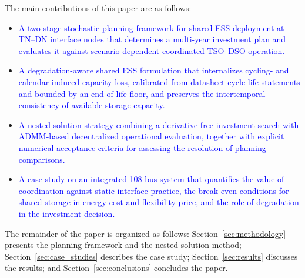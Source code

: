 \documentclass[preprint,12pt]{elsarticle}
\begin{document}
The main contributions of this paper are as follows:
\begin{itemize}
    \item \textcolor{blue}{A two-stage stochastic planning framework for shared ESS deployment at TN--DN interface nodes that determines a multi-year investment plan and evaluates it against scenario-dependent coordinated TSO--DSO operation.}
    \item \textcolor{blue}{A degradation-aware shared ESS formulation that internalizes cycling- and calendar-induced capacity loss, calibrated from datasheet cycle-life statements and bounded by an end-of-life floor, and preserves the intertemporal consistency of available storage capacity.}
    \item \textcolor{blue}{A nested solution strategy combining a derivative-free investment search with ADMM-based decentralized operational evaluation, together with explicit numerical acceptance criteria for assessing the resolution of planning comparisons.}
    \item \textcolor{blue}{A case study on an integrated 108-bus system that quantifies the value of coordination against static interface practice, the break-even conditions for shared storage in energy cost and flexibility price, and the role of degradation in the investment decision.}
\end{itemize}


The remainder of the paper is organized as follows:
Section~\ref{sec:methodology} presents the planning framework and the nested solution method;
Section~\ref{sec:case_studies} describes the case study;
Section~\ref{sec:results} discusses the results; and
Section~\ref{sec:conclusions} concludes the paper.

\end{document}
